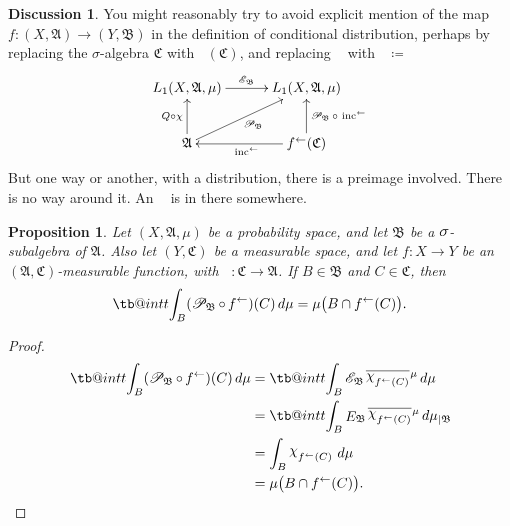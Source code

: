 \documentclass[
twoside=true,
paper=letter,
fontsize=9pt,
pagesize=auto,
leqno,
openany,
headsepline,
overfullrule,
]{scrbook}
\makeatletter
\theoremstyle{plain}
\theoremstyle{plain}
\newtheorem{prop}[thm]{Proposition}
\theoremstyle{definition}
\newtheorem{discussion}[thm]{Discussion}
\theoremstyle{bfnoteitalic}
\theoremstyle{bfnoteroman}
\newcommand{\sigalg}[1]{\mathfrak{#1}}
\newcommand{\cali}[1]{\mathscr{#1}}
\newcommand{\definedby}{\coloneqq}
\newcommand{\kondexpsub}[2]
{\mathop{E}\nolimits_{#2}\hspace{-1pt}#1}
\newcommand{\condexpsub}[2]
{\mathop{\cali{E}\hspace{-1.5pt}}\nolimits_{#2}\hspace{-1pt}#1}
\newcommand{\condexpop}[1]{\mathop{\cali{E}\hspace{-1pt}}\nolimits_{#1}}
\newcommand{\condprobop}[1]{\mathop{\cali{P}\hspace{-1pt}}\nolimits_{#1}}
\newcommand{\textsigma}{\hbox{\large{$\sigma$}}\kern-1pt}
\newcommand{\charfunction}[1]{\mathop{{\raisebox{2pt}{$\chi$}}_{#1}}}
\newcommand{\restrictedto}[1]{_{\lvert#1}\kern-1.5pt}
\newcommand{\preimage}[1]{\mathop{#1^{\leftarrow}}}
\newcommand{\meets}{\cap}
\newcommand{\sigmaalgebra}{\sigalg{A}}
\newcommand{\sigmaalgebraii}{\sigalg{B}}
\newcommand{\sigmaalgebraiii}{\sigalg{C}}
\newcommand{\Lone}{L_1(\measurespace, \sigmaalgebra, \measure)}
\newcommand{\function}{f}
\newcommand{\measurespace}{X}
\newcommand{\measurespaceii}{Y}
\newcommand{\measure}{\mu}
\newcommand{\setii}{B}
\newcommand{\setiii}{C}
\newcommand*\xbar[1]{%
   \hbox{%
     \vbox{%
       \hrule height 0.4pt %
       \kern0.4ex%
       \hbox{%
         \ensuremath{#1}%
       }%
     }%
   }%
}
\newcommand\tint{\mathop{\mathpalette\tb@int{t}}\!\int}
\newcommand\tb@int[2]{%
  \sbox\z@{$\m@th#1\int$}%
  \if#2t%
    \rlap{\hbox to\wd\z@{%
      \hfil
      \vrule width .35em height \dimexpr\ht\z@+1.4pt\relax depth -\dimexpr\ht\z@+1pt\relax
      \kern.05em %
    }}
  \else
    \rlap{\hbox to\wd\z@{%
      \vrule width .35em height -\dimexpr\dp\z@+1pt\relax depth \dimexpr\dp\z@+1.4pt\relax
      \hfil
    }}
  \fi
}
\newcommand{\lebclass}[1]{\hspace{.5pt}\xbar{#1}\hspace{0.5pt}}
\newcommand{\ellclass}[2]{\lebclass{#1}^{#2}}
\newcommand{\inducedint}{\tint}
\makeatother
\begin{document}
\begin{discussion}\label{avoid_function}
You might reasonably try to avoid explicit mention of the map 
$\function:(\measurespace,\sigmaalgebra)\to (\measurespaceii,\sigmaalgebraii)$
in the definition of conditional distribution, perhaps by replacing the \textsigma\hyp{}algebra 
$\sigmaalgebraiii$ with $\preimage{\function}(\sigmaalgebraiii)$, and replacing
$\preimage{\function}$ with 
$\preimage{\text{inc}} \definedby \preimage{\text{inclusion}}$
\[
\xymatrix@C=30pt{ 
\Lone \ar[r]^{\condexpop{\sigmaalgebraii}} 
& \Lone 
\\
\sigmaalgebra 
\ar[u]^-{Q\circ\chi} 
\ar[ur]_{\condprobop{\sigmaalgebraii}} 
& \preimage{\function}(\sigmaalgebraiii) \ar[l]^{\preimage{\text{inc}}} 
\ar[u]_{\condprobop{\sigmaalgebraii}\circ\,\preimage{\text{inc}}}
}
\]
But one way or another, with a distribution, there is a preimage involved.
There is no way around it.  An $\preimage{\function}$ is in there somewhere.
\end{discussion}



\begin{prop}\label{conditional_probability_of_a_set}
Let $(\measurespace, \sigmaalgebra, \measure)$ be a probability space, and let $\sigmaalgebraii$ be a $\textsigma$-subalgebra of $\sigmaalgebra$. Also let $(\measurespaceii, \sigmaalgebraiii)$ be a measurable space, and let 
$\function:\measurespace\to\measurespaceii$ be an
$(\sigmaalgebra, \sigmaalgebraiii)$\hyp{}measurable function, with
$\preimage{\function} : \sigmaalgebraiii \to \sigmaalgebra$.  
If $\setii\in\sigmaalgebraii$ and $\setiii\in\sigmaalgebraiii$, then
\[
\inducedint_\setii (\condprobop{\sigmaalgebraii}\circ \preimage{\function})(\setiii)\,d\measure
=
\measure\bigl(\setii\meets\preimage{\function}(\setiii)\bigr).
\]
\end{prop}


\begin{proof}
\begin{align*}
\inducedint_\setii (\condprobop{\sigmaalgebraii}\circ \preimage{\function})(\setiii)\,d\measure
&= \inducedint_\setii 
\condexpsub{\ellclass{\charfunction{\preimage{\function}(\setiii)}}{\measure}}{\sigmaalgebraii}
\,d\measure \\
&= \inducedint_\setii 
\kondexpsub{\ellclass{\charfunction{\preimage{\function}(\setiii)}}{\measure}}{\sigmaalgebraii}
\,d\measure\restrictedto{\sigmaalgebraii} \\
&= \int_\setii \charfunction{\preimage{f}(\setiii)}\,d\mu \\
&= \measure\bigl(\setii\meets\preimage{\function}(\setiii)\bigr).\\
\end{align*}
\end{proof}
\end{document}
